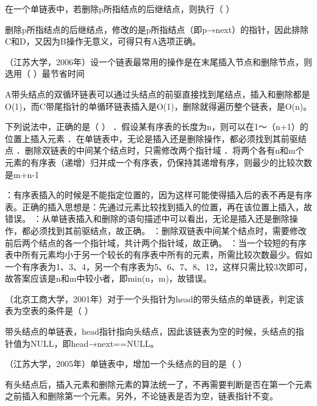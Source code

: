 \question 在一个单链表中，若删除p所指结点的后继结点，则执行（ ）
\par{}
\begin{solution}删除p所指结点的后继结点，修改的是p所指结点（即p→next）的指针，因此排除C和D，又因为B操作无意义，可得只有A选项正确。
\end{solution}
\question （江苏大学，2006年）设一个链表最常用的操作是在末尾插入节点和删除节点，则选用（
）最节省时间
\par{}
\begin{solution}A带头结点的双循环链表可以通过头结点的前驱直接找到尾结点，插入和删除都是O(1)，而C带尾指针的单循环链表插入是O(1)，删除就得遍历整个链表，是O(n)。
\end{solution}
\question 下列说法中，正确的是（ ）
．假设某有序表的长度为n，则可以在1～（n+1）的位置上插入元素
．在单链表中，无论是插入还是删除操作，都必须找到其前驱结点
．删除双链表的中间某个结点时，只需修改两个指针域
．将两个各有n和m个元素的有序表（递增）归并成一个有序表，仍保持其递增有序，则最少的比较次数是m+n-1
\par{}
\begin{solution}：有序表插入的时候是不能指定位置的，因为这样可能使得插入后的表不再是有序表。正确的插入思想是：先通过元素比较找到插入的位置，再在该位置上插入，故错误。
：从单链表插入和删除的语句描述中可以看出，无论是插入还是删除操作，都必须找到其前驱结点，故正确。
：删除双链表中间某个结点时，需要修改前后两个结点的各一个指针域，共计两个指针域，故正确。
：当一个较短的有序表中所有元素均小于另一个较长的有序表中所有的元素，所需比较次数最少。假如一个有序表为1、3、4，另一个有序表为5、6、7、8、12，这样只需比较3次即可，故答案应该是n和m中较小者，即min(n，m)，故错误。
\end{solution}
\question （北京工商大学，2001年）对于一个头指针为head的带头结点的单链表，判定该表为空表的条件是（
）
\par{}
\begin{solution}带头结点的单链表，head指针指向头结点，因此该链表为空的时候，头结点的指针值为NULL，即head→next==NULL。
\end{solution}
\question （江苏大学，2005年）单链表中，增加一个头结点的目的是（ ）
\par{}
\begin{solution}有头结点后，插入元素和删除元素的算法统一了，不再需要判断是否在第一个元素之前插入和删除第一个元素。另外，不论链表是否为空，链表指针不变。
\end{solution}
